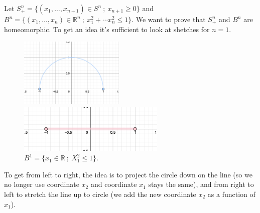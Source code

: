 \documentclass[a4paper,11pt]{article}
\begin{document}
Let $S_{+}^{n} = \{ (x_1, \ldots , x_{n+1}) \in S^n \ ; \ x_{n + 1} \geq 0\}$ and $B^n = \{ (x_1, \ldots, x_n) \in \mathbb{R}^n \ ; \ x_1^2 + \cdots x_n^2 \leq 1\}$. We want to prove that $S_{+}^{n}$ and $B^n$ are homeomorphic.
To get an idea it's sufficient to look at shetches for $n = 1$.

\newpage
\begin{figure}[ht]
    \begin{minipage}{0.5\textwidth}
         \centering
         \includegraphics[width=50mm]{X_n1_2.png}
         \caption{$S_{+}^{1} = \{ (x_1, x_2)\in S^1 \ ; \ x_{2} \geq 0\}$.}
    \end{minipage}\hfill
    \begin{minipage}{0.5\textwidth}
         \centering
         \includegraphics[width=70mm]{Y_n1_2.png}
         \caption{$B^1 = \{ x_1 \in \mathbb{R} \ ; \ X_1^2  \leq 1\}$.}
    \end{minipage}\hfill
\end{figure}

To get from left to right, the idea is to project the circle down on the line (so we no longer use coordinate $x_2$ and coordinate $x_1$ stays the same), and from right to left to stretch the line up to circle (we add the new coordinate $x_2$ as a function of $x_1$). 
\end{document}
